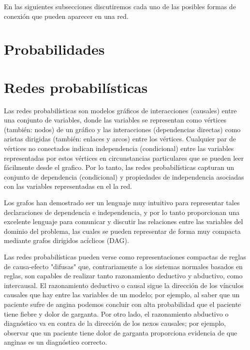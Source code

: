 En las siguientes subsecciones discutiremos cada uno de las posibles formas de conexión que pueden aparecer en una red.

\section{Probabilidades} 
\section{Redes probabilísticas}
Las redes probabilísticas son modelos gráficos de interacciones (causales) entre una
conjunto de variables, donde las variables se representan como vértices (también: nodos)
de un gráfico y las interacciones (dependencias directas) como aristas dirigidas (también:
enlaces y arcos) entre los vértices. Cualquier par de vértices no conectados indican 
independencia (condicional) entre las variables representadas
por estos vértices en circunstancias particulares que se pueden leer fácilmente desde el
grafico. Por lo tanto, las redes probabilísticas capturan un conjunto de dependencia (condicional)
y propiedades de independencia asociadas con las variables representadas en el
la red.

Los grafos han demostrado ser un lenguaje muy intuitivo para representar
tales declaraciones de dependencia e independencia, y por lo tanto proporcionan una excelente
lenguaje para comunicar y discutir las relaciones entre las 
variables del dominio del problema, las cuales se pueden representar de forma muy compacta 
mediante grafos dirigidos acíclicos (DAG).

Las redes probabilísticas pueden verse como representaciones compactas de reglas de causa-efecto "difusas" 
que, contrariamente a los sistemas normales basados en reglas, son capables de realizar tanto razonamiento 
deductivo y abductivo, como intercausal. El razonamiento deductivo o causal
sigue la dirección de los vínculos causales que hay entre las variables de un modelo; por ejemplo, al saber
que un paciente sufre de angina podemos concluir con alta probabilidad que
el paciente tiene fiebre y dolor de garganta. Por otro lado, el razonamiento abductivo o diagnóstico 
va en contra de la dirección de los nexos causales; por ejemplo, observar
que un paciente tiene dolor de garganta proporciona evidencia de que anginas es un diagnóstico correcto.

